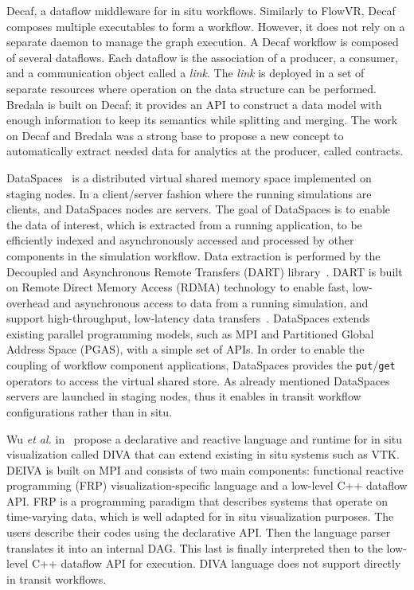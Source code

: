 Decaf\cite{dreher_decaf_2017}, a dataflow middleware for in situ workflows. Similarly to FlowVR, Decaf composes multiple executables to form a workflow. However, it does not rely on a separate daemon to manage the graph execution. A Decaf workflow is composed of several dataflows. Each dataflow is the association of a producer, a consumer, and a communication object called a \textit{link}.  The \textit{link} is deployed in a set of separate resources where operation on the data structure can be performed. Bredala\cite{dreher_bredala_2016} is built on Decaf; it provides an API to construct a data model with enough information to keep its semantics while splitting and merging. The work on Decaf and Bredala was a strong base to propose a new concept to automatically extract needed data for analytics at the producer, called contracts\cite{mommessin_automatic_2017}.


DataSpaces~\cite{docan_dataspaces_2012} is a distributed virtual shared memory space implemented on staging nodes. 
In a client/server fashion where the running simulations are clients, and DataSpaces nodes are servers.  
The goal of DataSpaces is to enable the data of interest, which is extracted from a running application, to be efficiently indexed and asynchronously accessed and processed by other components in the simulation workflow. 
Data extraction is performed by the Decoupled and Asynchronous Remote Transfers (DART) library~\cite{DART_2008, docan2010enabling_dart}. 
DART is built on Remote Direct Memory Access (RDMA) technology to enable fast, low-overhead and asynchronous access to data from a running simulation, and support high-throughput, low-latency data transfers~\cite{bennett_combining_2012_dataspaces}. 
DataSpaces extends existing parallel programming models, such as MPI and Partitioned Global Address Space (PGAS), with a simple set of APIs. In order to enable the coupling of workflow component applications, DataSpaces provides the \texttt{put}/\texttt{get} operators to access the virtual shared store. As already mentioned DataSpaces servers are launched in staging nodes, thus it enables in transit workflow configurations rather than in situ.

Wu \textit{et al.} in~\cite{wu_diva_2020} propose a declarative and reactive language and runtime for in situ visualization called DIVA that can extend existing in situ systems such as VTK. DEIVA is built on MPI and consists of two main components: functional reactive programming (FRP) visualization-specific language and a low-level C++ dataflow API. FRP\cite{ wan2000functional_FRP, blackheath2016functional_FRP, perez2016functional_FRP} is a programming paradigm that describes systems that operate on time-varying data, which is well adapted for in situ visualization purposes. The users describe their codes using the declarative API. Then the language parser translates it into an internal DAG. This last is finally interpreted then to the low-level C++ dataflow API for execution. DIVA language does not support directly in transit workflows.
 

